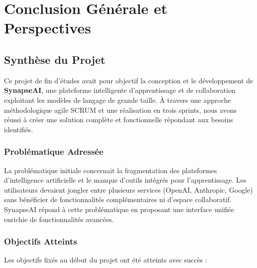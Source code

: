 

\chapter*{Conclusion Générale et Perspectives}
%
%

\vspace{1cm}

\section*{Synthèse du Projet}

Ce projet de fin d'études avait pour objectif la conception et le développement de \textbf{SynapseAI}, une plateforme intelligente d'apprentissage et de collaboration exploitant les modèles de langage de grande taille. À travers une approche méthodologique agile SCRUM et une réalisation en trois sprints, nous avons réussi à créer une solution complète et fonctionnelle répondant aux besoins identifiés.

\subsection*{Problématique Adressée}

La problématique initiale concernait la fragmentation des plateformes d'intelligence artificielle et le manque d'outils intégrés pour l'apprentissage. Les utilisateurs devaient jongler entre plusieurs services (OpenAI, Anthropic, Google) sans bénéficier de fonctionnalités complémentaires ni d'espace collaboratif. SynapseAI répond à cette problématique en proposant une interface unifiée enrichie de fonctionnalités avancées.

\subsection*{Objectifs Atteints}

Les objectifs fixés au début du projet ont été atteints avec succès :

